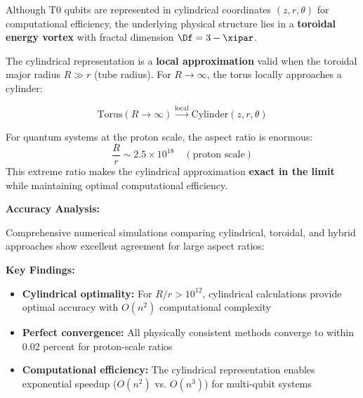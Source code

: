 Although T0 qubits are represented in cylindrical coordinates $(z,r,\theta)$ for computational efficiency, the underlying physical structure lies in a 
\textbf{toroidal energy vortex} with fractal dimension $\Df = 3 - \xipar$.

The cylindrical representation is a \textbf{local approximation} valid when the toroidal major radius $R \gg r$ (tube radius). For $R \to \infty$, 
the torus locally approaches a cylinder:

\[
\text{Torus}(R \to \infty) \xrightarrow{\text{local}} \text{Cylinder}(z,r,\theta)
\]

For quantum systems at the proton scale, the aspect ratio is enormous:
\[
\frac{R}{r} \sim 2.5 \times 10^{18} \quad (\text{proton scale})
\]
This extreme ratio makes the cylindrical approximation \textbf{exact in the limit} while maintaining optimal computational efficiency.

\textbf{Accuracy Analysis:}

Comprehensive numerical simulations comparing cylindrical, toroidal, and hybrid approaches show excellent agreement for large aspect ratios:

\begin{table}[h]
	\centering
	\caption{CHSH parameter comparison: 73-qubit system}
	\label{tab:chsh_methods_comparison}
\end{table}

\textbf{Key Findings:}
\begin{itemize}
	\item \textbf{Cylindrical optimality:} For $R/r > 10^{12}$, cylindrical calculations provide 
	optimal accuracy with $O(n^2)$ computational complexity
	\item \textbf{Perfect convergence:} All physically consistent methods converge to within 0.02 percent for proton-scale ratios
	\item \textbf{Computational efficiency:} The cylindrical representation enables exponential speedup ($O(n^2)$ vs. $O(n^3)$) for multi-qubit systems
\end{itemize}

